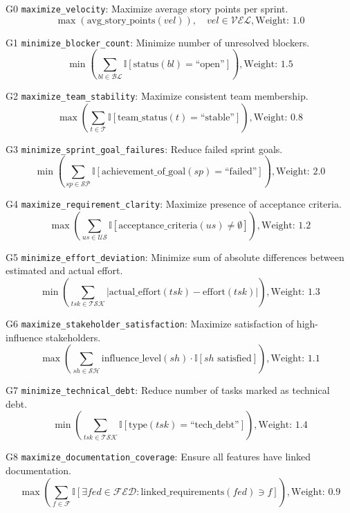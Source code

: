 \documentclass[11pt]{article}
\begin{document}
\item[G0] \texttt{maximize\_velocity}: Maximize average story points per sprint.
    \[
    \max \left( \text{avg\_story\_points}(vel) \right), \quad vel \in \mathcal{VEL}, \text{Weight: } 1.0
    \]
    
    \item[G1] \texttt{minimize\_blocker\_count}: Minimize number of unresolved blockers.
    \[
    \min \left( \sum_{bl \in \mathcal{BL}} \mathbb{I}[\text{status}(bl) = \text{``open''}] \right), \text{Weight: } 1.5
    \]
    
    \item[G2] \texttt{maximize\_team\_stability}: Maximize consistent team membership.
    \[
    \max \left( \sum_{t \in \mathcal{T}} \mathbb{I}[\text{team\_status}(t) = \text{``stable''}] \right), \text{Weight: } 0.8
    \]
    
    \item[G3] \texttt{minimize\_sprint\_goal\_failures}: Reduce failed sprint goals.
    \[
    \min \left( \sum_{sp \in \mathcal{SP}} \mathbb{I}[\text{achievement\_of\_goal}(sp) = \text{``failed''}] \right), \text{Weight: } 2.0
    \]
    
    \item[G4] \texttt{maximize\_requirement\_clarity}: Maximize presence of acceptance criteria.
    \[
    \max \left( \sum_{us \in \mathcal{US}} \mathbb{I}[\text{acceptance\_criteria}(us) \neq \emptyset] \right), \text{Weight: } 1.2
    \]
    
    \item[G5] \texttt{minimize\_effort\_deviation}: Minimize sum of absolute differences between estimated and actual effort.
    \[
    \min \left( \sum_{tsk \in \mathcal{TSK}} |\text{actual\_effort}(tsk) - \text{effort}(tsk)| \right), \text{Weight: } 1.3
    \]
    
    \item[G6] \texttt{maximize\_stakeholder\_satisfaction}: Maximize satisfaction of high-influence stakeholders.
    \[
    \max \left( \sum_{sh \in \mathcal{SH}} \text{influence\_level}(sh) \cdot \mathbb{I}[sh \text{ satisfied}] \right), \text{Weight: } 1.1
    \]
    
    \item[G7] \texttt{minimize\_technical\_debt}: Reduce number of tasks marked as technical debt.
    \[
    \min \left( \sum_{tsk \in \mathcal{TSK}} \mathbb{I}[\text{type}(tsk) = \text{``tech\_debt''}] \right), \text{Weight: } 1.4
    \]
    
    \item[G8] \texttt{maximize\_documentation\_coverage}: Ensure all features have linked documentation.
    \[
    \max \left( \sum_{f \in \mathcal{F}} \mathbb{I}[\exists fed \in \mathcal{FED} : \text{linked\_requirements}(fed) \ni f] \right), \text{Weight: } 0.9
    \]
    
\end{document}
